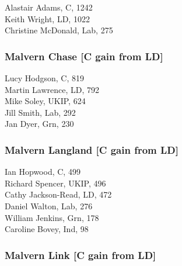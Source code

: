 \documentclass[a4paper,openany,10pt]{book}
\begin{document}
Alastair Adams, C, 1242\\
Keith Wright, LD, 1022\\
Christine McDonald, Lab, 275\\


\subsubsection*{Malvern Chase \hspace*{\fill}\nolinebreak[1]%
\enspace\hspace*{\fill}
[C gain from LD]}



Lucy Hodgson, C, 819\\
Martin Lawrence, LD, 792\\
Mike Soley, UKIP, 624\\
Jill Smith, Lab, 292\\
Jan Dyer, Grn, 230\\


\subsubsection*{Malvern Langland \hspace*{\fill}\nolinebreak[1]%
\enspace\hspace*{\fill}
[C gain from LD]}



Ian Hopwood, C, 499\\
Richard Spencer, UKIP, 496\\
Cathy Jackson-Read, LD, 472\\
Daniel Walton, Lab, 276\\
William Jenkins, Grn, 178\\
Caroline Bovey, Ind, 98\\


\subsubsection*{Malvern Link \hspace*{\fill}\nolinebreak[1]%
\enspace\hspace*{\fill}
[C gain from LD]}

\end{document}
